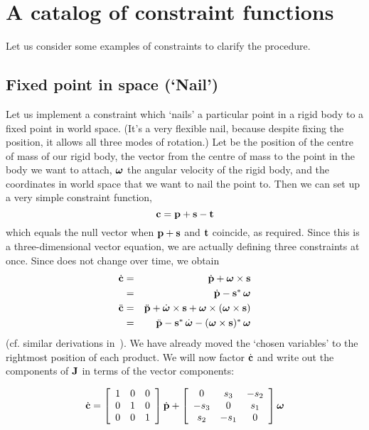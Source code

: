 \section{A catalog of constraint functions\label{constraintAppendix}}

Let us consider some examples of constraints to clarify the procedure.

\subsection{Fixed point in space (`Nail')}

Let us implement a constraint which `nails' a particular point in a rigid body to a fixed point
in world space. (It's a very flexible nail, because despite fixing the position, it allows all
three modes of rotation.) Let  be the position of the centre of mass of our rigid
body,  the vector from the centre of mass to the point in the body we want to attach,
$\ve{\omega}$ the angular velocity of the rigid body, and  the coordinates in world
space that we want to nail the point to. Then we can set up a very simple constraint function,
\begin{equation}
\ve{c} = \ve{p} + \ve{s} - \ve{t}
\end{equation}
which equals the null vector when $\ve{p}+\ve{s}$ and $\ve{t}$ coincide, as required.
Since this is a three-dimensional vector equation, we are actually defining three constraints
at once. Since  does not change over time, we obtain
\begin{eqnarray}
\dot{\ve{c}} &=& \dot{\ve{p}} + \ve{\omega}\times\ve{s} \nonumber\\
&=& \dot{\ve{p}} - \dual{\ve{s}}\,\ve{\omega} \\
\ddot{\ve{c}} &=& \ddot{\ve{p}} + \dot{\ve{\omega}}\times\ve{s} +
    \ve{\omega}\times(\ve{\omega}\times\ve{s}) \nonumber\\
&=& \ddot{\ve{p}} - \dual{\ve{s}}\,\dot{\ve{\omega}} -
    \dual{(\ve{\omega}\times\ve{s})}\,\ve{\omega}
\end{eqnarray}
(cf. similar derivations in~\cite{Kalra:95}). We have already moved the `chosen variables' to
the rightmost position of each product. We will now factor $\dot{\ve{c}}$ and write out the
components of $\m{J}$ in terms of the vector components:

\begin{equation}
\label{constrEx1J}
\dot{\ve{c}} = \left[\begin{array}{ccc} 1&0&0\\0&1&0\\0&0&1 \end{array}\right]
    \dot{\ve{p}} + \left[\begin{array}{ccc}
    0 & s_3 & -s_2 \\ -s_3 & 0 & s_1 \\ s_2 & -s_1 & 0
    \end{array}\right] \ve{\omega}
\end{equation}

